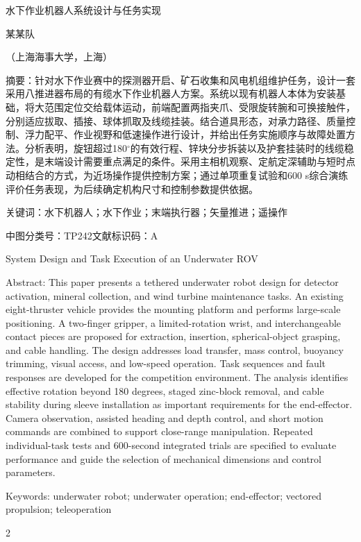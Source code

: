 \documentclass[UTF8,zihao=5,fontset=none]{ctexart}
\begin{document}
\begin{center}
{\sffamily\fontsize{16}{21}\selectfont 水下作业机器人系统设计与任务实现\par}
\vspace{6pt}
{\fontsize{9}{12}\selectfont 某某队\par （上海海事大学，上海）\par}
\end{center}
{\fontsize{9}{13}\selectfont\noindent 摘要：针对水下作业赛中的探测器开启、矿石收集和风电机组维护任务，设计一套采用八推进器布局的有缆水下作业机器人方案。系统以现有机器人本体为安装基础，将大范围定位交给载体运动，前端配置两指夹爪、受限旋转腕和可换接触件，分别适应拔取、插接、球体抓取及线缆挂装。结合道具形态，对承力路径、质量控制、浮力配平、作业视野和低速操作进行设计，并给出任务实施顺序与故障处置方法。分析表明，旋钮超过180\(^{\circ}\)的有效行程、锌块分步拆装以及护套挂装时的线缆稳定性，是末端设计需要重点满足的条件。采用主相机观察、定航定深辅助与短时点动相结合的方式，为近场操作提供控制方案；通过单项重复试验和600 s综合演练评价任务表现，为后续确定机构尺寸和控制参数提供依据。\par\noindent 关键词：水下机器人；水下作业；末端执行器；矢量推进；遥操作\par}
{\fontsize{9}{12}\selectfont\noindent 中图分类号：TP242\quad 文献标识码：A\par}
\begin{center}
{\fontsize{14}{18}\selectfont System Design and Task Execution of an Underwater ROV\par}
\end{center}
{\fontsize{9}{12}\selectfont\noindent Abstract: This paper presents a tethered underwater robot design for detector activation, mineral collection, and wind turbine maintenance tasks. An existing eight-thruster vehicle provides the mounting platform and performs large-scale positioning. A two-finger gripper, a limited-rotation wrist, and interchangeable contact pieces are proposed for extraction, insertion, spherical-object grasping, and cable handling. The design addresses load transfer, mass control, buoyancy trimming, visual access, and low-speed operation. Task sequences and fault responses are developed for the competition environment. The analysis identifies effective rotation beyond 180 degrees, staged zinc-block removal, and cable stability during sleeve installation as important requirements for the end-effector. Camera observation, assisted heading and depth control, and short motion commands are combined to support close-range manipulation. Repeated individual-task tests and 600-second integrated trials are specified to evaluate performance and guide the selection of mechanical dimensions and control parameters.\par\noindent Keywords: underwater robot; underwater operation; end-effector; vectored propulsion; teleoperation\par}
\fontsize{10.5}{17}\selectfont
\begin{multicols}{2}
\raggedcolumns

\end{multicols}
\end{document}
